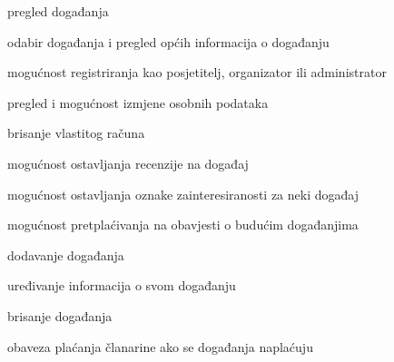 			
			\begin{packed_enum}
				\item  {}
				
				\begin{packed_enum}
					
					\item pregled događanja
					\item odabir događanja i pregled općih informacija o događanju
					\item mogućnost registriranja kao posjetitelj, organizator ili administrator
					
				\end{packed_enum}
				
				\item  {}
				
				\begin{packed_enum}
					
					\item pregled i mogućnost izmjene osobnih podataka
					\item brisanje vlastitog računa
					\item mogućnost ostavljanja recenzije na događaj
					\item mogućnost ostavljanja oznake zainteresiranosti za neki događaj
					\item mogućnost pretplaćivanja na obavjesti o budućim događanjima
					
					
				\end{packed_enum}
				
				\item  {}
				
				\begin{packed_enum}
									
					\item dodavanje događanja
					\item uređivanje informacija o svom događanju
					\item brisanje događanja
					\item obaveza plaćanja članarine ako se događanja naplaćuju
					
					
				\end{packed_enum}
				
				\item  {}
				
				\begin{packed_enum}	
					

\end{packed_enum}
\end{packed_enum}
